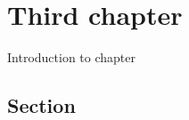 \chapter{Third chapter}
\label{chap:third-chapter}
Introduction to chapter

\section{Section}
\label{sec:third-section}

\newpage
